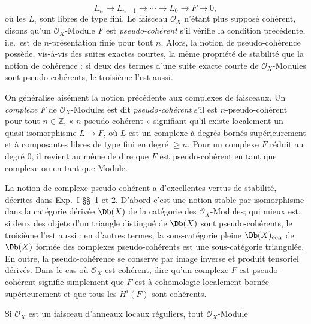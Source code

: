 \[
  L_n\longrightarrow L_{n-1}\longrightarrow \cdots \longrightarrow L_0\longrightarrow F\longrightarrow 0,
\]
où les \(L_i\)
sont libres de type fini. Le faisceau \(\mathcal O_X\) n'étant plus supposé cohérent, disons qu'un \(\mathcal O_X\)-Module \(F\) est \emph{pseudo-cohérent} s'il vérifie la condition précédente, i.e.\ est de \(n\)-présentation finie pour tout \(n\). Alors, la notion de pseudo-cohérence possède, vis-à-vis des suites exactes courtes, la même propriété de stabilité que la notion de cohérence : si deux des termes d'une suite exacte courte de \(\mathcal O_X\)-Modules sont pseudo-cohérents, le troisième l'est aussi.

On généralise aisément la notion précédente aux complexes de faisceaux. Un \emph{complexe} \(F\) de \(\mathcal O_X\)-Modules est dit \emph{pseudo-cohérent} s'il est \(n\)-pseudo-cohérent pour tout \(n\in\mathbb Z\), « \(n\)-pseudo-cohérent » signifiant qu'il existe localement un quasi-isomorphisme \(L\to F\), où \(L\) est un complexe à degrés bornés supérieurement et à composantes libres de type fini en degré \(\geq n\). Pour un complexe \(F\) réduit au degré \(0\), il revient au même de dire que \(F\) est pseudo-cohérent en tant que complexe ou en tant que Module.

La notion de complexe pseudo-cohérent a d'excellentes vertus de stabilité, décrites dans Exp.\ I \S\S~1 et 2. D'abord c'est une notion stable par isomorphisme dans la catégorie dérivée \(\Db(X)\) de la catégorie des \(\mathcal O_X\)-Modules; qui mieux est, si deux des objets d'un triangle distingué de \(\Db(X)\) sont pseudo-cohérents, le troisième l'est aussi : en d'autres termes, la sous-catégorie pleine \(\Db(X)_{\mathrm{coh}}\) de \(\Db(X)\) formée des complexes pseudo-cohérents est une sous-catégorie triangulée. En outre, la pseudo-cohérence se conserve par image inverse et produit tensoriel dérivés. Dans le cas où \(\mathcal O_X\) est cohérent, dire qu'un complexe \(F\) est pseudo-cohérent signifie simplement que \(F\) est à cohomologie localement bornée supérieurement et que tous les \(\underline H^i(F)\) sont cohérents.

Si \(\mathcal O_X\) est un faisceau d'anneaux locaux réguliers, tout \(\mathcal O_X\)-Module
